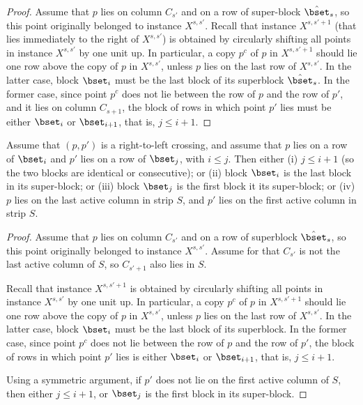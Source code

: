 \documentclass{toc}
\begin{document}
\begin{proof}
Assume that $p$ lies on column $C_{s'}$ and on a row of super-block $\hat\bset_s$, so this point originally belonged to instance $X^{s,s'}$. Recall that instance $X^{s,s'+1}$  (that lies immediately to the right of $X^{s,s'}$) is obtained by circularly shifting all points in instance $X^{s,s'}$ by one unit up. In particular, a copy $p^c$ of $p$ in $X^{s,s'+1}$ should lie one row above the copy of $p$ in $X^{s,s'}$, unless $p$ lies on the last row of $X^{s,s'}$. In the latter case, block $\bset_i$ must be the last block of its superblock $\hat \bset_s$. In the former case, since point $p^c$ does not lie between the row of $p$ and the row of $p'$, and it lies on column $C_{s+1}$, the block of rows in which point $p'$ lies must be either $\bset_i$ or $\bset_{i+1}$, that is, $j\leq i+1$.
\end{proof}

\begin{claim}\label{claim: right to left crossing}
	Assume that $(p,p')$ is a right-to-left crossing, and assume that $p$ lies on a row of $\bset_i$ and $p'$ lies on a row of $\bset_j$, with $i\leq j$. Then either (i) $j\leq i+1$ (so the two blocks are identical or consecutive); or (ii) block $\bset_i$ is the last block in its super-block; or (iii) block $\bset_j$ is the first block it its super-block; or (iv) $p$ lies on the last active column in strip $S$, and $p'$ lies on the first active column in strip $S$.
\end{claim}

\begin{proof}
	Assume that $p$ lies on column $C_{s'}$ and on a row of superblock $\hat \bset_s$, so this point originally belonged to instance $X^{s,s'}$. 
	Assume for that $C_{s'}$ is not the last active column of $S$, so $C_{s'+1}$ also lies in $S$. 
	
	Recall that instance $X^{s,s'+1}$ is obtained by circularly shifting all points in instance $X^{s,s'}$ by one unit up. In particular, a copy $p^c$ of $p$ in $X^{s,s'+1}$ should lie one row above the copy of $p$ in $X^{s,s'}$, unless $p$ lies on the last row of $X^{s,s'}$. In the latter case, block $\bset_i$ must be the last block of its superblock. In the former case, since point $p^c$ does not lie between the row of $p$ and the row of $p'$, the block of rows in which point $p'$ lies is either $\bset_i$ or $\bset_{i+1}$,  that is, $j\leq i+1$.
	
	Using a symmetric argument, if $p'$ does not lie on the first active column of $S$, then either $j\leq i+1$, or $\bset_j$ is the first block in its super-block.
\end{proof}
\end{document}

